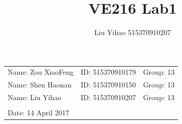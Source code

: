 \documentclass{article}
\title{VE216 Lab1}
\author{Liu Yihao 515370910207}
\date{}
\begin{document}
\vspace*{0.25cm}

\hrulefill

\thispagestyle{empty}

\begin{center}
\begin{large}
\end{large}

\hrulefill

\vspace*{5cm}
\begin{Large}
\end{Large}

\vspace{2em}

\begin{large}
\end{large}
\end{center}

\vfill

\begin{table}[h!]
\flushleft
\begin{tabular}{lll}
Name: Zou XiaoFeng \hspace*{2em}&
ID: 515370910179\hspace*{2em}
& Group: 13\\
Name: Shen Haonan \hspace*{2em}&
ID: 515370910150\hspace*{2em}
& Group: 13\\
Name: Liu Yihao \hspace*{2em}&
ID: 515370910207\hspace*{2em}
& Group: 13\\
\\

Date: 14 April 2017 

\end{tabular}
\end{table}

\hfill

\newpage
\end{document}
